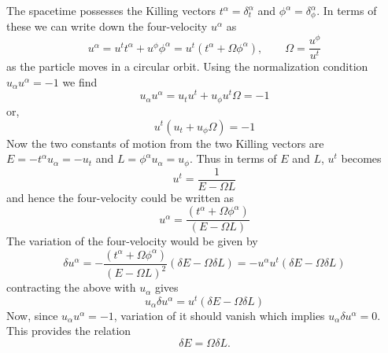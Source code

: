 \documentclass[fleqn]{article}
\begin{document}
\begin{enumerate}
   The spacetime possesses the Killing vectors $t^\alpha = \delta^\alpha_t$ and $\phi^\alpha = \delta^\alpha_\phi$. In terms of these we can write down the four-velocity $u^\alpha$ as
  \begin{equation}
    \label{eq:four-velocity}
    u^\alpha = u^t t^\alpha + u^\phi \phi^\alpha = u^t(t^\alpha + \Omega \phi^\alpha),\qquad \Omega = \frac{u^\phi}{u^t}
  \end{equation}
  as the particle moves in a circular orbit. Using the normalization condition $u_\alpha u^\alpha = -1$ we find
  \begin{equation}
    \label{eq:normalization-condition}
    u_\alpha u^\alpha = u_tu^t + u_\phi u^t\Omega = -1
  \end{equation}
  or,
  \begin{equation}
    \label{eq:normalization-condition-2}
    u^t(u_t + u_\phi \Omega) = -1
  \end{equation}
  Now the two constants of motion from the two Killing vectors are $E = - t^\alpha u_\alpha = -u_t$ and $L = \phi^\alpha u_\alpha = u_\phi$. Thus in terms of $E$ and $L$, $u^t$ becomes
  \begin{equation}
    \label{eq:u^t}
    u^t = \frac{1}{E - \Omega L}
  \end{equation}
  and hence the four-velocity could be written as
  \begin{equation}
    \label{eq:four-velocity-2}
    u^\alpha = \frac{(t^\alpha + \Omega \phi^\alpha)}{(E -\Omega L)}
  \end{equation}
  The variation of the four-velocity would be given by
  \begin{equation}
    \label{eq:variation-u^alpha}
    \delta u^\alpha = -\frac{(t^\alpha + \Omega \phi^\alpha)}{(E -\Omega L)^2}(\delta E - \Omega \delta L) = - u^\alpha u^t (\delta E - \Omega \delta L)
  \end{equation}
  contracting the above with $u_\alpha$ gives
  \begin{equation}
    \label{eq:u_alpha-delta-u^alpha}
    u_\alpha \delta u^\alpha = u^t(\delta E - \Omega \delta L)
  \end{equation}
  Now, since $u_\alpha u^\alpha = -1$, variation of it should vanish which implies $u_\alpha \delta u^\alpha = 0$. This provides the relation
  \begin{equation}
    \label{eq:deltaE-deltaL}
    \boxed{\delta E = \Omega \delta L}.
  \end{equation}
\end{enumerate}
\end{document}
